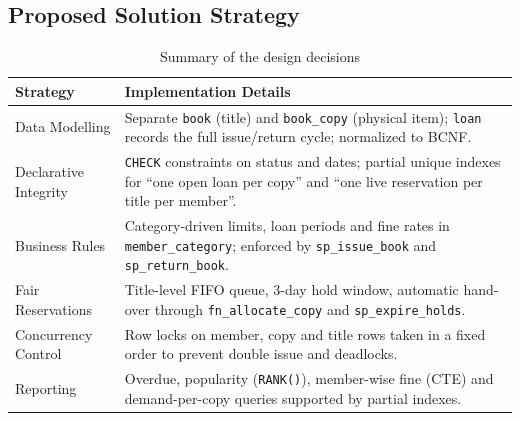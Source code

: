 \documentclass[11pt,a4paper]{report}
\begin{document}
\subsection{Proposed Solution Strategy}
\begin{table}[H]
    \centering
    \caption{Summary of the design decisions}
    \vspace{2mm}
    \begin{tabular}{|l|p{10cm}|}
        \hline
        \textbf{Strategy} & \textbf{Implementation Details} \\ \hline
        Data Modelling & Separate \texttt{book} (title) and \texttt{book\_copy} (physical item); \texttt{loan} records the full issue/return cycle; normalized to BCNF. \\ \hline
        Declarative Integrity & \texttt{CHECK} constraints on status and dates; partial unique indexes for ``one open loan per copy'' and ``one live reservation per title per member''. \\ \hline
        Business Rules & Category-driven limits, loan periods and fine rates in \texttt{member\_category}; enforced by \texttt{sp\_issue\_book} and \texttt{sp\_return\_book}. \\ \hline
        Fair Reservations & Title-level FIFO queue, 3-day hold window, automatic hand-over through \texttt{fn\_allocate\_copy} and \texttt{sp\_expire\_holds}. \\ \hline
        Concurrency Control & Row locks on member, copy and title rows taken in a fixed order to prevent double issue and deadlocks. \\ \hline
        Reporting & Overdue, popularity (\texttt{RANK()}), member-wise fine (CTE) and demand-per-copy queries supported by partial indexes. \\ \hline
    \end{tabular}
\end{table}
\end{document}
